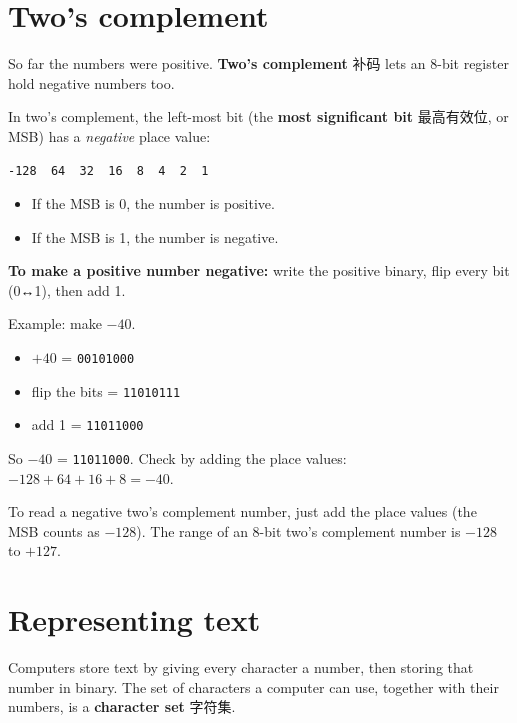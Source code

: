 \documentclass[11pt]{article}
\begin{document}
\section*{Two's complement}

So far the numbers were positive. \textbf{Two's complement} 补码 lets an 8-bit register hold negative numbers too.

In two's complement, the left-most bit (the \textbf{most significant bit} 最高有效位, or MSB) has a \emph{negative} place value:

\begin{Verbatim}
-128  64  32  16  8  4  2  1
\end{Verbatim}

\begin{itemize}
\item If the MSB is 0, the number is positive.

\item If the MSB is 1, the number is negative.

\end{itemize}

\textbf{To make a positive number negative:} write the positive binary, flip every bit (0↔1), then add 1.

Example: make $-40$.

\begin{itemize}
\item $+40$ = \texttt{00101000}

\item flip the bits = \texttt{11010111}

\item add 1 = \texttt{11011000}

\end{itemize}

So $-40$ = \texttt{11011000}. Check by adding the place values: $-128 + 64 + 16 + 8 = -40$.

To read a negative two's complement number, just add the place values (the MSB counts as $-128$). The range of an 8-bit two's complement number is $-128$ to $+127$.

\section*{Representing text}

Computers store text by giving every character a number, then storing that number in binary. The set of characters a computer can use, together with their numbers, is a \textbf{character set} 字符集.
\end{document}
